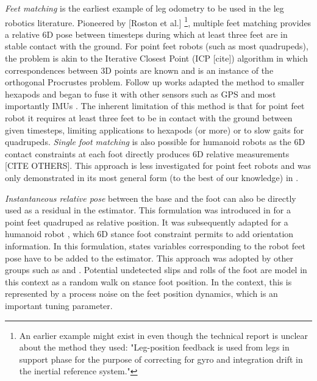 \textit{Feet matching} is the earliest example of leg odometry to be used in the leg robotics literature. Pioneered by [Roston et al.] 
\footnote{An earlier example might exist in \cite{roston1991dead} even though the technical report is unclear about the method they used: 
"Leg-position feedback is used from legs in support phase for the purpose of correcting for gyro and integration drift in the inertial reference system."},
multiple feet matching provides a relative 6D pose between timesteps during which at least three feet are in stable contact with the ground.
For point feet robots (such as most quadrupeds), the problem is akin to the Iterative Closest Point (ICP [cite]) algorithm in which correspondences between 3D points are known and is an instance of the orthogonal Procrustes problem.
Follow up works adapted the method to smaller hexapods \cite{lin2005leg} and began to fuse it with other sensors such as GPS \cite{gassmann2005localization, cobano2008location} 
and most importantly IMUs \cite{lin2006sensor, reinstein2011dead}.
The inherent limitation of this method is that for point feet robot it requires at least three feet to be in contact with the ground between given timesteps, limiting
applications to hexapods (or more) or to slow gaits for quadrupeds.
\textit{Single foot matching} is also possible for humanoid robots as the 6D contact constraints at each foot directly produces 6D 
relative measurements \cite{flayols2017experimental} [CITE OTHERS]. This approach is less investigated for point feet robots and was only 
demonstrated in its most general form (to the best of our knowledge) in \cite{fourmy2021contact}.

\textit{Instantaneous relative pose} between the base and the foot can also be directly used as a residual in the estimator. This formulation
was introduced in \cite{bloesch2013state} for a point feet quadruped as relative position. It was subsequently adapted for a humanoid robot \cite{rotella2014state}, 
which 6D stance foot constraint permits to add orientation information. In this formulation, states variables corresponding to the robot feet pose have to 
be added to the estimator. This approach was adopted by other groups such as \cite{hartley2018legged, hartley2018hybrid, hartley2020contact} and \cite{bledt2018cheetah}.
Potential undetected slips and rolls of the foot are model in this context as a random walk on stance foot position. In the \KalmanF context, this is represented 
by a process noise on the feet position dynamics, which is an important tuning parameter.

